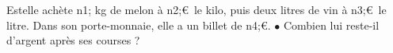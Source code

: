 \documentclass[exercice]{thedocument}%
\begin{document}
%
Estelle achète \<n1; kg de melon à \<n2;\euro\ le kilo, puis deux litres de vin à \<n3;\euro\ le litre.
Dans son porte-monnaie, elle a un billet de \<n4;\euro.\vskip10pt\noindent
$\bullet$\hskip10pt Combien lui reste-il d'argent après ses courses ?
\end{document}
